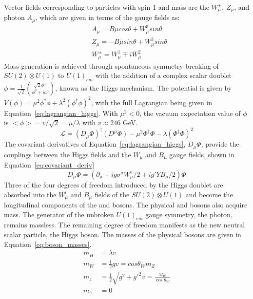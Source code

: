 Vector fields corresponding to particles with spin 1 and mass are the $W_\mu^\pm$, $Z_\mu$, and photon $A_\mu$, which are given in terms of the gauge fields as:
\begin{equation}
\begin{aligned}
    &A_\mu = B\mu cos\theta + W^3_\mu sin\theta\\
&Z_\mu = -B\mu sin\theta + W^3_\mu sin\theta\\
&W_\mu^\pm = W_\mu^1 \mp i W^2_\mu
\end{aligned}
\label{eq:ewk_s1_particles}
\end{equation}
Mass generation is achieved through spontaneous symmetry breaking of $SU(2)\otimes U(1)$ to $U(1)_{em}$ with the addition of a complex scalar doublet $\phi = \frac{1}{\sqrt{2}}\binom{\sqrt{2}\phi^+}{\phi^0 + ia^0}$, known as the Higgs mechanism\cite{ewsb1,ewsb2,ewsb3}. The potential is given by $V(\phi) = \mu^2\phi^\dagger\phi + \lambda^2(\phi^\dagger \phi)^2$, with the full Lagrangian being given in Equation~\ref{eq:lagrangian_higgs}. With $\mu^2 < 0$, the vacuum expectation value of $\phi$ is $<\phi> = v/\sqrt{2} = \mu/\lambda$ with $v\approx 246$ GeV. 
\begin{equation}
    \mathcal{L} = (D_\mu\Phi)^\dagger(D^\mu\Phi) - \mu^2 \Phi^\dagger\Phi - \lambda(\Phi^\dagger\Phi)^2
    \label{eq:lagrangian_higgs}
\end{equation}
The covariant derivatives of Equation~\ref{eq:lagrangian_higgs}, $D_\mu\Phi$, provide the couplings between the Higgs fields and the $W_\mu$ and $B_\mu$ gauge fields, shown in Equation~\ref{eq:covariant_deriv}
\begin{equation}
    D_\mu \Phi = (\partial_\mu + ig\sigma^aW_\mu^a/2 + ig'YB_\mu/2)\Phi
    \label{eq:covariant_deriv}
\end{equation}
Three of the four degrees of freedom introduced by the Higgs doublet are absorbed into the $W^i_\mu$ and $B_\mu$ fields of the $SU(2)\otimes U(1)$ and become the longitudinal components of the \W and \Z bosons. The physical \W and \Z bosons also acquire mass. The generator of the unbroken $U(1)_{em}$ gauge symmetry, the photon, remains massless. The remaining degree of freedom manifests as the new neutral scalar particle, the Higgs boson. The masses of the physical bosons are given in Equation~\ref{eq:boson_masses}.
\begin{equation}
\begin{aligned}
m_H &= \lambda v \\ 
m_W &= \frac{1}{2}g v = cos\theta_W m_Z \\ 
m_z &= \frac{1}{2}\sqrt{g^2+g'^2}v  = \frac{M_W}{\cos{\theta_W}}\\ 
m_\gamma &= 0
\end{aligned}
\label{eq:boson_masses}
\end{equation}
